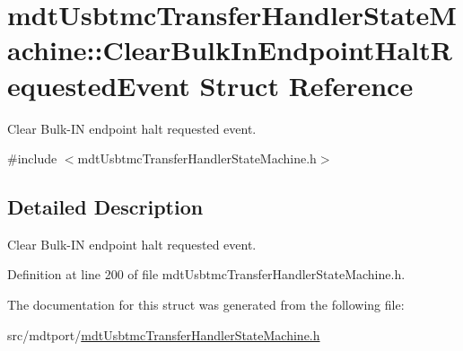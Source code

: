 \hypertarget{structmdt_usbtmc_transfer_handler_state_machine_1_1_clear_bulk_in_endpoint_halt_requested_event}{\section{mdt\-Usbtmc\-Transfer\-Handler\-State\-Machine\-:\-:Clear\-Bulk\-In\-Endpoint\-Halt\-Requested\-Event Struct Reference}
\label{structmdt_usbtmc_transfer_handler_state_machine_1_1_clear_bulk_in_endpoint_halt_requested_event}
}


Clear Bulk-\/\-I\-N endpoint halt requested event.  




{\ttfamily \#include $<$mdt\-Usbtmc\-Transfer\-Handler\-State\-Machine.\-h$>$}



\subsection{Detailed Description}
Clear Bulk-\/\-I\-N endpoint halt requested event. 

Definition at line 200 of file mdt\-Usbtmc\-Transfer\-Handler\-State\-Machine.\-h.



The documentation for this struct was generated from the following file\-:\begin{DoxyCompactItemize}
\item 
src/mdtport/\hyperlink{mdt_usbtmc_transfer_handler_state_machine_8h}{mdt\-Usbtmc\-Transfer\-Handler\-State\-Machine.\-h}\end{DoxyCompactItemize}
